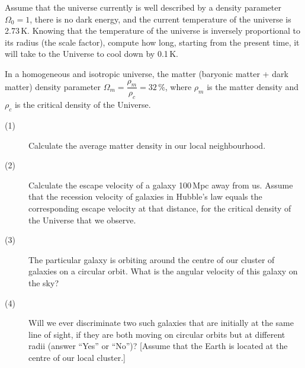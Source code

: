 Assume that the universe currently is well described by a density parameter
$\Omega_0 = 1$, there is no dark energy, and the current temperature of the
universe is 2.73\,K. Knowing that the temperature of the universe is inversely
proportional to its radius (the scale factor), compute how long, starting from
the present time, it will take to the Universe to cool down by 0.1\,K.

In a homogeneous and isotropic universe, the matter (baryonic matter + dark
matter) density parameter
$\Omega_m = \dfrac{\rho_m}{\rho_c} = 32\,\%$, where $\rho_m$ is the matter
density and $\rho_c$ is the critical density of the Universe.

\begin{description}
\item[(1)] Calculate the average matter density in our local neighbourhood.
\item[(2)] Calculate the escape velocity of a galaxy 100\,Mpc away from us.
  Assume that the recession velocity of galaxies in Hubble's law equals the
  corresponding escape velocity at that distance, for the critical density of
  the Universe that we observe.
\item[(3)] The particular galaxy is orbiting around the centre of our cluster
  of galaxies on a circular orbit. What is the angular velocity of this galaxy
  on the sky?
\item[(4)] Will we ever discriminate two such galaxies that are initially at
  the same line of sight, if they are both moving on circular orbits but at
  different radii (answer ``Yes'' or ``No'')? [Assume that the Earth is
  located at the centre of our local cluster.]
\end{description}

